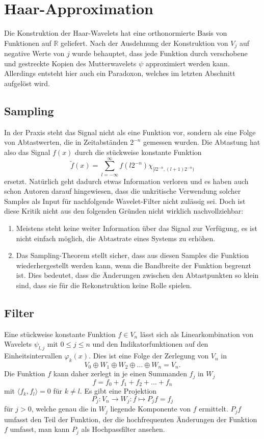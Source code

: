 %
%
%
\section{Haar-Approximation
\label{haar:approximation}}
Die Konstruktion der Haar-Wavelets hat eine orthonormierte Basis von
Funktionen auf $\mathbb R$ geliefert.
Nach der Ausdehnung der Konstruktion von $V_j$ auf negative Werte von $j$
wurde behauptet, dass jede Funktion durch verschobene und gestreckte 
Kopien des Mutterwavelets $\psi$ approximiert werden kann.
Allerdings entsteht hier auch ein Paradoxon, welches im letzten Abschnitt
aufgelöst wird.

\subsection{Sampling}
In der Praxis steht das Signal nicht als eine Funktion vor, sondern
als eine Folge von Abtastwerten, die in Zeitabständen $2^{-n}$ 
gemessen wurden.
Die Abtastung hat also das Signal $f(x)$ durch die stückweise
konstante Funktion
\[
\tilde{f}(x)
=
\sum_{l=-\infty}^\infty f(l2^{-n}) \chi_{[l2^{-n},(l+1)2^{-n})}
\]
ersetzt.
Natürlich geht dadurch etwas Information verloren und es haben auch
schon Autoren darauf hingewiesen, dass die unkritische Verwendung solcher
Samples als Input für nachfolgende Wavelet-Filter nicht zulässig sei.
Doch ist diese Kritik nicht aus den folgenden Gründen nicht wirklich
nachvollziehbar:
\begin{enumerate}
\item
Meistens steht keine weiter Information über das Signal zur Verfügung,
es ist nicht einfach möglich, die Abtastrate eines Systems zu erhöhen.
\item
Das Sampling-Theorem stellt sicher, dass aus diesen Samples die Funktion
wiederhergestellt werden kann, wenn die Bandbreite der Funktion 
begrenzt ist.
Dies bedeutet, dass die Änderungen zwischen den Abtastpunkten so klein
sind, dass sie für die Rekonstruktion keine Rolle spielen.
\end{enumerate}

\subsection{Filter}\label{haar:approximation:filter}
Eine stückweise konstante Funktion $f\in V_n$ lässt sich als Linearkombination
von Wavelets $\psi_{l,j}$ mit $0\le j \le n$ und den Indikatorfunktionen
auf den Einheitsintervallen $\varphi_k(x)$. 
Dies ist eine Folge der Zerlegung von $V_n$ in
\begin{equation}
V_0 \oplus W_1 \oplus W_2 \oplus \dots \oplus W_n = V_n.
\label{haar:filtersumme}
\end{equation}
Die Funktion $f$ kann daher zerlegt in je einen Summanden $f_j$ in $W_j$
\[
f = f_0 + f_1 + f_2 + \dots + f_n
\]
mit $\langle f_k,f_l\rangle = 0$ für $k\ne l$.
Es gibt eine Projektion
\[
P_j \colon V_n \to W_j : f \mapsto P_jf = f_j
\]
für $j>0$, welche genau die in $W_j$ liegende Komponente von $f$ 
ermittelt.
$P_jf$ umfasst den Teil der Funktion, der die hochfrequenten Änderungen
der Funktion $f$ umfasst, man kann $P_j$ als Hochpassfilter ansehen.

